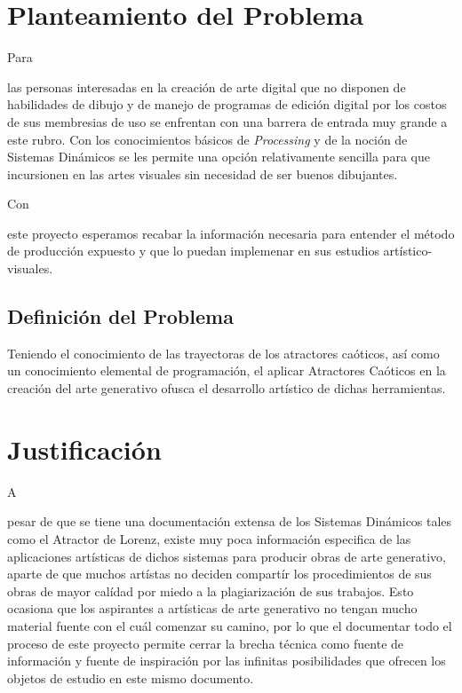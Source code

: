 \documentclass[stu, 12pt, letterpaper, donotrepeattitle, floatsintext]{apa7}
\begin{document}
    \section*{Planteamiento del Problema}
    Para \begin{justifying}
      las personas interesadas en la creación de arte digital que no disponen de habilidades de dibujo y de manejo de programas de edición digital por los costos
      de sus membresias de uso se enfrentan con una barrera de entrada muy grande a este rubro. Con los conocimientos básicos de \emph{Processing} y de la noción de Sistemas Dinámicos
      se les permite una opción relativamente sencilla para que incursionen en las artes visuales sin necesidad de ser buenos dibujantes.\par
    \end{justifying}
    Con \begin{justifying}
      este proyecto esperamos recabar la información necesaria para entender el método de producción expuesto y que lo puedan implemenar
      en sus estudios artístico-visuales.\par
    \end{justifying}
    \vspace{\baselineskip}
    \subsection*{Definición del Problema}
    Teniendo el conocimiento de las trayectoras de los atractores caóticos, así como un conocimiento
    elemental de programación, el aplicar Atractores Caóticos en la creación del arte generativo ofusca el 
    desarrollo artístico de dichas herramientas.\par
    \vspace{\baselineskip}
    \section*{Justificación}
    A \begin{justifying}
      pesar de que se tiene una documentación extensa de los Sistemas Dinámicos tales como el Atractor de Lorenz, existe
      muy poca información especifica de las aplicaciones artísticas de dichos sistemas para producir obras de arte generativo, aparte de que 
      muchos artístas no deciden compartír los procedimientos de sus obras de mayor calídad por miedo a la plagiarización de sus trabajos. Esto
      ocasiona que los aspirantes a artísticas de arte generativo no tengan mucho material fuente con el cuál comenzar su camino, por lo que
      el documentar todo el proceso de este proyecto permite cerrar la brecha técnica como fuente de información y fuente de inspiración por
      las infinitas posibilidades que ofrecen los objetos de estudio en este mismo documento.\par
    \end{justifying}
    \vspace{\baselineskip}
\end{document}
